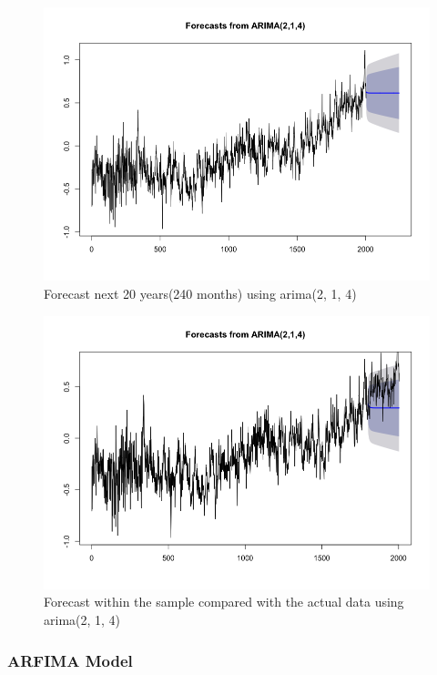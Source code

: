 \documentclass[a4paper,10pt]{article}
\begin{document}
\begin{figure}[H]
\centering
\caption{Forecast next 20 years(240 months) using arima(2, 1, 4)}
\includegraphics[scale=.5]{arima_forecast.png}
\end{figure}

\begin{figure}[H]
\centering
\caption{Forecast within the sample compared with the actual data using arima(2, 1, 4)}
\includegraphics[scale=.5]{arima_sample.png}
\end{figure}


\subsubsection{ARFIMA Model}
\end{document}
